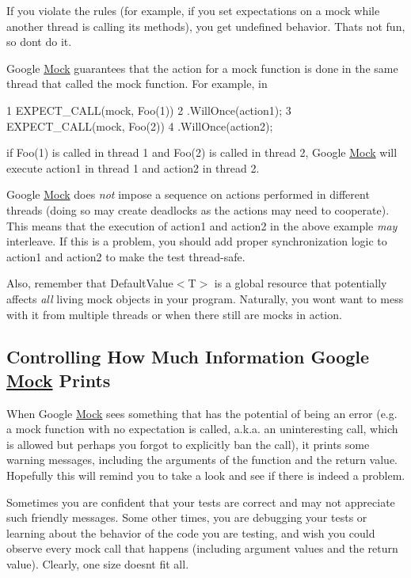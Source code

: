 If you violate the rules (for example, if you set expectations on a mock while another thread is calling its methods), you get undefined behavior. That\textquotesingle{}s not fun, so don\textquotesingle{}t do it.

Google \hyperlink{class_mock}{Mock} guarantees that the action for a mock function is done in the same thread that called the mock function. For example, in


\begin{DoxyCode}
1 EXPECT\_CALL(mock, Foo(1))
2     .WillOnce(action1);
3 EXPECT\_CALL(mock, Foo(2))
4     .WillOnce(action2);
\end{DoxyCode}


if {\ttfamily Foo(1)} is called in thread 1 and {\ttfamily Foo(2)} is called in thread 2, Google \hyperlink{class_mock}{Mock} will execute {\ttfamily action1} in thread 1 and {\ttfamily action2} in thread 2.

Google \hyperlink{class_mock}{Mock} does {\itshape not} impose a sequence on actions performed in different threads (doing so may create deadlocks as the actions may need to cooperate). This means that the execution of {\ttfamily action1} and {\ttfamily action2} in the above example {\itshape may} interleave. If this is a problem, you should add proper synchronization logic to {\ttfamily action1} and {\ttfamily action2} to make the test thread-\/safe.

Also, remember that {\ttfamily Default\+Value$<$T$>$} is a global resource that potentially affects {\itshape all} living mock objects in your program. Naturally, you won\textquotesingle{}t want to mess with it from multiple threads or when there still are mocks in action.

\subsection*{Controlling How Much Information Google \hyperlink{class_mock}{Mock} Prints}

When Google \hyperlink{class_mock}{Mock} sees something that has the potential of being an error (e.\+g. a mock function with no expectation is called, a.\+k.\+a. an uninteresting call, which is allowed but perhaps you forgot to explicitly ban the call), it prints some warning messages, including the arguments of the function and the return value. Hopefully this will remind you to take a look and see if there is indeed a problem.

Sometimes you are confident that your tests are correct and may not appreciate such friendly messages. Some other times, you are debugging your tests or learning about the behavior of the code you are testing, and wish you could observe every mock call that happens (including argument values and the return value). Clearly, one size doesn\textquotesingle{}t fit all.

